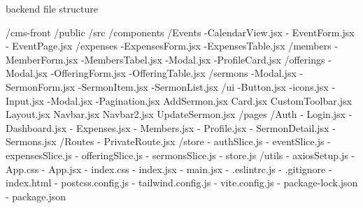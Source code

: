 backend file structure 

/cms-front
 /public
 /src
   /components
    /Events
       -CalendarView.jsx
       - EventForm.jsx
       - EventPage.jsx
     /expenses
      -ExpensesForm.jsx
      -ExpensesTable.jsx
     /members
      -MemberForm.jsx
      -MembersTabel.jsx
      -Modal.jsx
      -ProfileCard.jsx
     /offerings
      -Modal.jsx
      -OfferingForm.jsx
      -OfferingTable.jsx
    /sermons
     -Modal.jsx
     -SermonForm.jsx
     -SermonItem.jsx
     -SermonList.jsx
    /ui
      -Button.jsx
      -icons.jsx
      -Input.jsx
      -Modal.jsx
      -Pagination.jsx
     AddSermon.jsx
     Card.jsx
     CustomToolbar.jsx
     Layout.jsx
     Navbar.jsx
     Navbar2.jsx
     UpdateSermon.jsx
   /pages
    /Auth
     - Login.jsx
    - Dashboard.jsx
    - Expenses.jsx
    - Members.jsx
    - Profile.jsx
    - SermonDetail.jsx
    - Sermons.jsx
  /Routes
  - PrivateRoute.jsx
  /store
    - authSlice.js
    - eventSlice.js
    - expensesSlice.js
    - offeringSlice.js
    - sermonsSlice.js
    - store.js
  /utils 
   - axiosSetup.js
   - App.css
   - App.jsx
   - index.css
   - index.jsx
   - main.jsx
   - .eslintrc.js
   - .gitignore
   - index.html
   - postcss.config.js
   - tailwind.config.js
   - vite.config.js
   - package-lock.json
   - package.json
